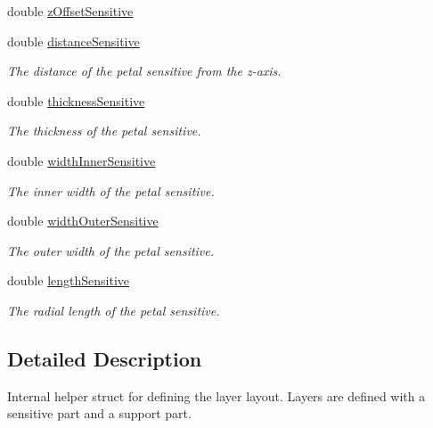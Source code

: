 \begin{DoxyCompactItemize}
double \hyperlink{struct_d_d4hep_1_1_d_d_rec_1_1_z_disk_petals_struct_1_1_layer_layout_a9ce8e7e2195166045f83358a3915e96f}{z\+Offset\+Sensitive}
\item 
double \hyperlink{struct_d_d4hep_1_1_d_d_rec_1_1_z_disk_petals_struct_1_1_layer_layout_a818dac342e6299ca88f0062682f7008d}{distance\+Sensitive}
\begin{DoxyCompactList}\small\item\em The distance of the petal sensitive from the z-\/axis. \end{DoxyCompactList}\item 
double \hyperlink{struct_d_d4hep_1_1_d_d_rec_1_1_z_disk_petals_struct_1_1_layer_layout_a49622208adfa9ec0dc736f92cfc82a46}{thickness\+Sensitive}
\begin{DoxyCompactList}\small\item\em The thickness of the petal sensitive. \end{DoxyCompactList}\item 
double \hyperlink{struct_d_d4hep_1_1_d_d_rec_1_1_z_disk_petals_struct_1_1_layer_layout_a662855ee8d2089bb1d109fc51e9307f1}{width\+Inner\+Sensitive}
\begin{DoxyCompactList}\small\item\em The inner width of the petal sensitive. \end{DoxyCompactList}\item 
double \hyperlink{struct_d_d4hep_1_1_d_d_rec_1_1_z_disk_petals_struct_1_1_layer_layout_a091abb2a08a38938db892456c7bdc21e}{width\+Outer\+Sensitive}
\begin{DoxyCompactList}\small\item\em The outer width of the petal sensitive. \end{DoxyCompactList}\item 
double \hyperlink{struct_d_d4hep_1_1_d_d_rec_1_1_z_disk_petals_struct_1_1_layer_layout_a4508db5622466189d102ac9289c6c3b9}{length\+Sensitive}
\begin{DoxyCompactList}\small\item\em The radial length of the petal sensitive. \end{DoxyCompactList}\end{DoxyCompactItemize}


\subsection{Detailed Description}
Internal helper struct for defining the layer layout. Layers are defined with a sensitive part and a support part. 


